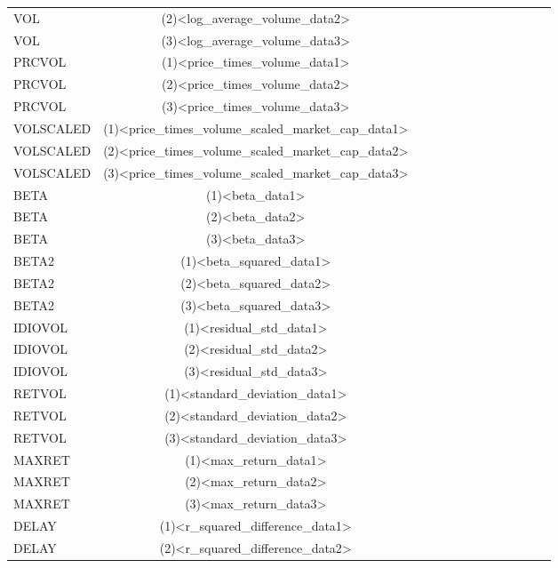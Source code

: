 \documentclass{article}
\begin{document}
\begin{center}
\begin{tabular}{lcccccccccccr}
            \\
            VOL & (2)<log_average_volume_data2>
            \\
            VOL & (3)<log_average_volume_data3>
            \\
            PRCVOL & (1)<price_times_volume_data1>
            \\
            PRCVOL & (2)<price_times_volume_data2>
            \\
            PRCVOL & (3)<price_times_volume_data3>
            \\
            VOLSCALED & (1)<price_times_volume_scaled_market_cap_data1>
            \\
            VOLSCALED & (2)<price_times_volume_scaled_market_cap_data2>
            \\
            VOLSCALED & (3)<price_times_volume_scaled_market_cap_data3>
            \\
            BETA & (1)<beta_data1>
            \\
            BETA & (2)<beta_data2>
            \\
            BETA & (3)<beta_data3>
            \\
            BETA2 & (1)<beta_squared_data1>
            \\
            BETA2 & (2)<beta_squared_data2>
            \\
            BETA2 & (3)<beta_squared_data3>
            \\
            IDIOVOL & (1)<residual_std_data1>
            \\
            IDIOVOL & (2)<residual_std_data2>
            \\
            IDIOVOL & (3)<residual_std_data3>
            \\
            RETVOL & (1)<standard_deviation_data1>
            \\
            RETVOL & (2)<standard_deviation_data2>
            \\
            RETVOL & (3)<standard_deviation_data3>
            \\
            MAXRET & (1)<max_return_data1>
            \\
            MAXRET & (2)<max_return_data2>
            \\
            MAXRET & (3)<max_return_data3>
            \\
            DELAY & (1)<r_squared_difference_data1>
            \\
            DELAY & (2)<r_squared_difference_data2>

\end{tabular}
\end{center}
\end{document}

